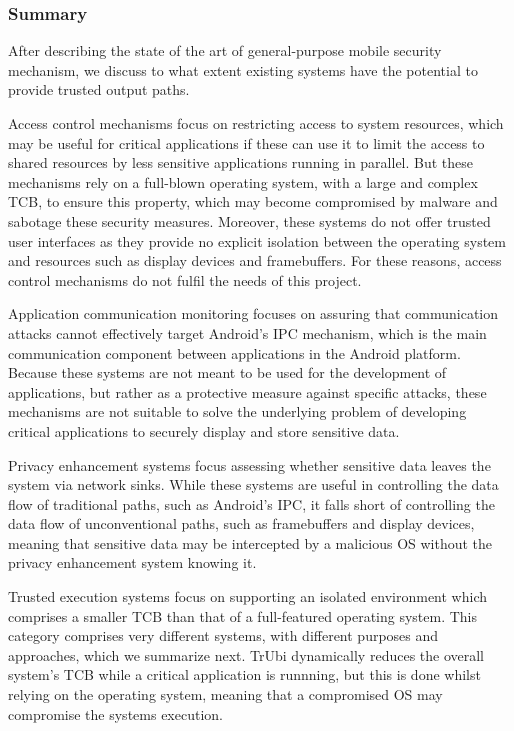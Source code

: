 \subsubsection{Summary}

After describing the state of the art of general-purpose mobile security mechanism, we discuss to what extent existing systems have the potential to provide trusted output paths.

Access control mechanisms focus on restricting access to system resources, which may be useful for critical applications if these can use it to limit the access to shared resources by less sensitive applications running in parallel. But these mechanisms rely on a full-blown operating system, with a large and complex TCB, to ensure this property, which may become compromised by malware and sabotage these security measures. Moreover, these systems do not offer trusted user interfaces as they provide no explicit isolation between the operating system and resources such as display devices and framebuffers. For these reasons, access control mechanisms do not fulfil the needs of this project.

Application communication monitoring focuses on assuring that communication attacks cannot effectively target Android's IPC mechanism, which is the main communication component between applications in the Android platform. Because these systems are not meant to be used for the development of applications, but rather as a protective measure against specific attacks, these mechanisms are not suitable to solve the underlying problem of developing critical applications to securely display and store sensitive data.

Privacy enhancement systems focus assessing whether sensitive data leaves the system via network sinks. While these systems are useful in controlling the data flow of traditional paths, such as Android's IPC, it falls short of controlling the data flow of unconventional paths, such as framebuffers and display devices, meaning that sensitive data may be intercepted by a malicious OS without the privacy enhancement system knowing it.

Trusted execution systems focus on supporting an isolated environment which comprises a smaller TCB than that of a full-featured operating system. This category comprises very different systems, with different purposes and approaches, which we summarize next. TrUbi dynamically reduces the overall system's TCB while a critical application is runnning, but this is done whilst relying on the operating system, meaning that a compromised OS may compromise the systems execution.

